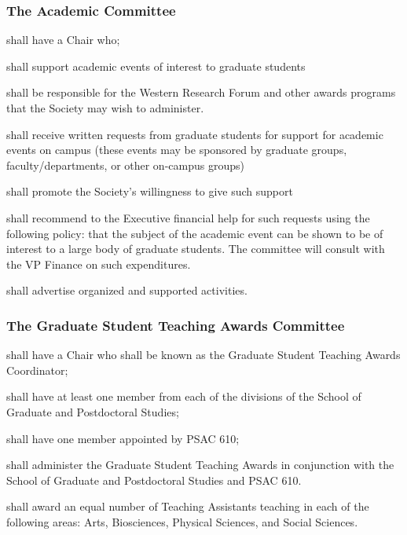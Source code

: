     
\subsubsection{The Academic Committee}

\begin{longenum}[ label*=\thesubsubsection.\arabic*., align=left]
	\item shall have a Chair who;
    \item shall support academic events of interest to graduate students
    \item shall be responsible for the Western Research Forum and other awards programs that the Society may wish to administer.
    \item shall receive written requests from graduate students for support for academic events on campus (these events may be sponsored by graduate groups, faculty/departments, or other on-campus groups)
    \item shall promote the Society's willingness to give such support
    \item shall recommend to the Executive financial help for such requests using the following policy: that the subject of the academic event can be shown to be of interest to a large body of graduate students. The committee will consult with the VP Finance on such expenditures.
    \item shall advertise organized and supported activities.

\end{longenum}

\subsubsection{The Graduate Student Teaching Awards Committee}
\begin{longenum}[ label*=\thesubsubsection.\arabic*., align=left]
	\item shall have a Chair who shall be known as the Graduate Student Teaching Awards Coordinator;
    \item shall have at least one member from each of the divisions of the School of Graduate and Postdoctoral Studies;
    \item shall have one member appointed by PSAC 610;
    \item shall administer the Graduate Student Teaching Awards in conjunction with the School of Graduate and Postdoctoral Studies and PSAC 610.
    \item shall award an equal number of Teaching Assistants teaching in each of the following areas: Arts, Biosciences, Physical Sciences, and Social Sciences.

\end{longenum}

